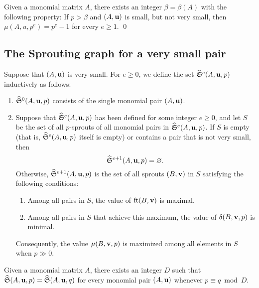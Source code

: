 \documentclass[11pt]{amsart}
\begin{document}
\begin{corollary}
   Given a monomial matrix $A$, there exists an integer $\beta = \beta(A)$ with the following property\textup: If $p > \beta$ and $(A, \mathbf{u})$ is small, but not very small, then $\mu(A,u,p^e) = p^e-1$ for every $e \geq 1$.
   \qed
\end{corollary}

\subsection{The Sprouting graph for a very small pair}
\begin{definition}
   Suppose that $(A, \mathbf{u})$ is very small.
   For $e \geq 0$, we define the set $\widehat{\mathfrak{S}}^e(A,\mathbf{u},p)$ inductively as follows:
\begin{enumerate}
\item $\widehat{\mathfrak{S}}^0(A, \mathbf{u}, p)$ consists of the single monomial pair $(A, \mathbf{u})$.
\item Suppose that $\widehat{\mathfrak{S}}^e(A, \mathbf{u}, p)$ has been defined for some integer $e \geq 0$, and let $S$ be the set of all $p$-sprouts of all monomial pairs in $\widehat{\mathfrak{S}}^e(A, \mathbf{u}, p)$.
If  $S$ is empty (that is, $\widehat{\mathfrak{S}}^e(A, \mathbf{u}, p)$ itself is empty) or contains a pair that is not very small, then \[ \widehat{\mathfrak{S}}^{e+1}(A, \mathbf{u}, p) = \varnothing.\]
Otherwise, $\widehat{\mathfrak{S}}^{e+1}(A, \mathbf{u}, p)$ is the set of all sprouts $(B, \mathbf{v})$ in $S$ satisfying the following conditions:

\begin{enumerate}
\item Among all pairs in $S$, the value of  $\operatorname{ft}(B, \mathbf{v})$ is maximal.
\item Among all pairs in $S$ that achieve this maximum, the value of $\delta(B, \mathbf{v}, p)$ is minimal.
\end{enumerate}
Consequently, the value $\mu(B, \mathbf{v},p)$ is maximized among all elements in $S$ when $p \gg 0$.
\end{enumerate}
\end{definition}


\begin{proposition}
   Given a monomial matrix $A$, there exists an integer $D$ such that $\widehat{\mathfrak{S}}(A, \mathbf{u}, p) = \widehat{\mathfrak{S}}(A, \mathbf{u}, q)$ for every monomial pair $(A, \mathbf{u})$ whenever $p \equiv q \bmod D$.
\end{proposition}
\end{document}
